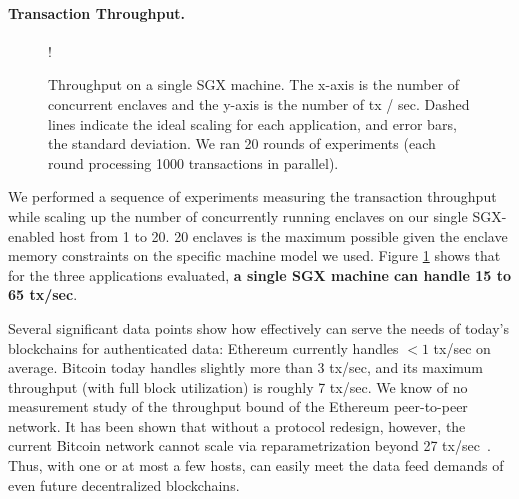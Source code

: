 \paragraph{Transaction Throughput.}
\begin{figure}[h]
  \resizebox {\columnwidth} {!}{
}
\caption{Throughput on a single SGX machine.  The x-axis is the number of
concurrent enclaves and the y-axis is the number of tx / sec. 
Dashed lines indicate the ideal scaling for each application, and error bars, the standard deviation.
We ran 20 rounds of experiments (each round processing 1000
transactions in parallel).}

\label{fig:trpt}
\end{figure}
We performed a sequence of experiments measuring the transaction throughput while scaling up the number of concurrently running enclaves 
on our single SGX-enabled host from 1 to 20. 20 \tc enclaves is the maximum possible given the enclave memory constraints on the specific machine model we used.
Figure \ref{fig:trpt}
shows that for the three applications evaluated,
{\bf a single SGX machine can handle
15 to 65
tx/sec}. 

Several significant data points show
how effectively \tc can serve the needs of 
today's blockchains for authenticated data: 
Ethereum currently handles 
$< 1$ tx/sec on average. 
Bitcoin today handles slightly more than
3 tx/sec, and 
its maximum throughput (with full block utilization)
is roughly 7 tx/sec.
We know of no measurement study of the
throughput bound of the Ethereum  peer-to-peer network.
It has been shown that without
a protocol redesign, however, the current 
Bitcoin network cannot scale via reparametrization beyond  
27 tx/sec~\cite{blockchainscaling}.
Thus, with one or at most a few hosts, \tc can easily meet the data feed demands of  
even future decentralized blockchains.



